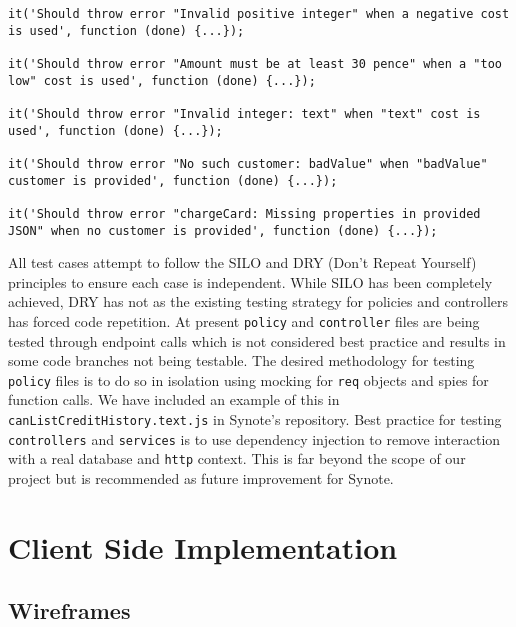 \begin{listing}[H]
\begin{verbatim}
it('Should throw error "Invalid positive integer" when a negative cost is used', function (done) {...});

it('Should throw error "Amount must be at least 30 pence" when a "too low" cost is used', function (done) {...});

it('Should throw error "Invalid integer: text" when "text" cost is used', function (done) {...});

it('Should throw error "No such customer: badValue" when "badValue" customer is provided', function (done) {...});

it('Should throw error "chargeCard: Missing properties in provided JSON" when no customer is provided', function (done) {...});

\end{verbatim}
\label{lst:stripe-test-cases}
\end{listing}

All test cases attempt to follow the SILO and DRY (Don't Repeat Yourself) principles to ensure each case is independent. While SILO has been completely achieved, DRY has not as the existing testing strategy for policies and controllers has forced code repetition. At present \texttt{policy} and \texttt{controller} files are being tested through endpoint calls which is not considered best practice and results in some code branches not being testable. The desired methodology for testing \texttt{policy} files is to do so in isolation using mocking for \texttt{req} objects and spies for function calls. We have included an example of this in \texttt{canListCreditHistory.text.js} in Synote's repository. Best practice for testing \texttt{controllers} and \texttt{services} is to use dependency injection to remove interaction with a real database and \texttt{http} context. This is far beyond the scope of our project but is recommended as future improvement for Synote.

\section{Client Side Implementation}
\label{sec:client-side-implementation}

\subsection{Wireframes}
\label{subsec:wireframes}

